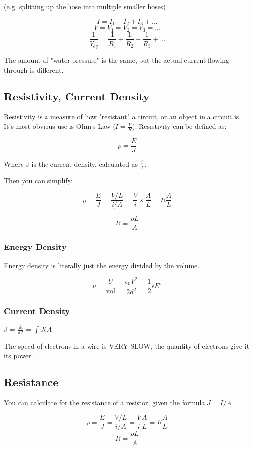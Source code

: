\documentclass{article}
\begin{document}
(e.g. splitting up the hose into multiple smaller hoses)

$$I = I_1 + I_2 + I_3 + ...$$
$$V = V_1 = V_2 = V_3 = ...$$
$$\frac{1}{V_{eq}} = \frac{1}{R_1} + \frac{1}{R_2} + \frac{1}{R_3} + ...$$

The amount of "water pressure" is the same, but the actual current flowing through is different. 

\subsection{Resistivity, Current Density}

Resistivity is a measure of how "resistant" a circuit, or an object in a circuit is. It's most obvious use is Ohm's Law ($I = \frac{V}{R}$). Resistivity can be defined as:

$$\rho = \frac{E}{J}$$

Where J is the current density, calculated as $\frac{i}{A}$.

Then you can simplify:

$$\rho = \frac{E}{J} = \frac{V / L}{i / A} = \frac{V}{i} \times \frac{A}{L} = R \frac{A}{L}$$

$$R = \frac{\rho L}{A}$$

\subsubsection{Energy Density}

Energy density is literally just the energy divided by the volume.

$$u = \frac{U}{\text{vol}} = \frac{\epsilon_0 V^2}{2 d^2 } = \frac{1}{2} \epsilon E^2$$

\subsubsection{Current Density}

J = $\frac{\delta i}{\delta A} = \int J \delta A$

The speed of electrons in a wire is VERY SLOW, the quantity of electrons give it its power.

\subsection{Resistance}

You can calculate for the resistance of a resistor, given the formula $J = I/A$

$$\rho = \frac{E}{J} = \frac{V / L}{i / A} = \frac{V}{i} \frac{A}{L} = R \frac{A}{L}$$
$$R = \frac{\rho L }{A}$$
\end{document}
